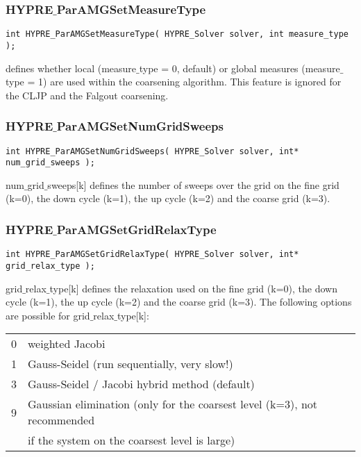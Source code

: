 \subsubsection*{HYPRE$\_$ParAMGSetMeasureType}
\begin{display}
\begin{verbatim}
int HYPRE_ParAMGSetMeasureType( HYPRE_Solver solver, int measure_type  );
\end{verbatim}
\end{display}
defines whether local (measure$\_$type = 0, default) or global measures 
(measure$\_$type = 1) are used within the coarsening 
algorithm. This feature is ignored for the CLJP and the Falgout coarsening.

\subsubsection*{HYPRE$\_$ParAMGSetNumGridSweeps}
\begin{display}
\begin{verbatim}
int HYPRE_ParAMGSetNumGridSweeps( HYPRE_Solver solver, int* num_grid_sweeps );
\end{verbatim}
\end{display}
num$\_$grid$\_$sweeps[k] defines the number of sweeps over the grid on the fine 
grid (k=0), the down cycle (k=1), the up cycle (k=2) and the coarse grid (k=3).

\subsubsection*{HYPRE$\_$ParAMGSetGridRelaxType}
\begin{display}
\begin{verbatim}
int HYPRE_ParAMGSetGridRelaxType( HYPRE_Solver solver, int* grid_relax_type );
\end{verbatim}
\end{display}
grid$\_$relax$\_$type[k] defines the relaxation used on the fine 
grid (k=0), the down cycle (k=1), the up cycle (k=2) and the coarse grid (k=3).
The following options are possible for grid$\_$relax$\_$type[k]:

\begin{tabular}{l l}
 0 & weighted Jacobi \\
 1 & Gauss-Seidel (run sequentially, very slow!) \\
 3 & Gauss-Seidel / Jacobi hybrid method (default) \\
 9 & Gaussian elimination (only for the coarsest level (k=3), not recommended\\ 
 & if the system on the coarsest level is large)\\
\end{tabular}

